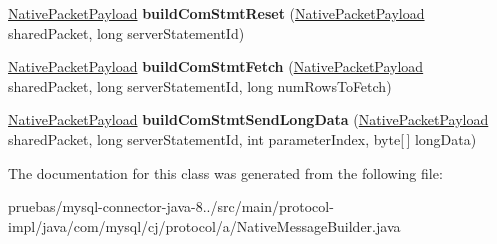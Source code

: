 \begin{DoxyCompactItemize}
\item 
\mbox{\label{classcom_1_1mysql_1_1cj_1_1protocol_1_1a_1_1_native_message_builder_a4acc76dd73bf697fc9757adf5e379682}} 
\mbox{\hyperlink{classcom_1_1mysql_1_1cj_1_1protocol_1_1a_1_1_native_packet_payload}{Native\+Packet\+Payload}} {\bfseries build\+Com\+Stmt\+Reset} (\mbox{\hyperlink{classcom_1_1mysql_1_1cj_1_1protocol_1_1a_1_1_native_packet_payload}{Native\+Packet\+Payload}} shared\+Packet, long server\+Statement\+Id)
\item 
\mbox{\label{classcom_1_1mysql_1_1cj_1_1protocol_1_1a_1_1_native_message_builder_a90d0a8827a6f07a6c70ffc5e3606b017}} 
\mbox{\hyperlink{classcom_1_1mysql_1_1cj_1_1protocol_1_1a_1_1_native_packet_payload}{Native\+Packet\+Payload}} {\bfseries build\+Com\+Stmt\+Fetch} (\mbox{\hyperlink{classcom_1_1mysql_1_1cj_1_1protocol_1_1a_1_1_native_packet_payload}{Native\+Packet\+Payload}} shared\+Packet, long server\+Statement\+Id, long num\+Rows\+To\+Fetch)
\item 
\mbox{\label{classcom_1_1mysql_1_1cj_1_1protocol_1_1a_1_1_native_message_builder_a1b4d0f770f5d97e69682bdcaa9e1bd6e}} 
\mbox{\hyperlink{classcom_1_1mysql_1_1cj_1_1protocol_1_1a_1_1_native_packet_payload}{Native\+Packet\+Payload}} {\bfseries build\+Com\+Stmt\+Send\+Long\+Data} (\mbox{\hyperlink{classcom_1_1mysql_1_1cj_1_1protocol_1_1a_1_1_native_packet_payload}{Native\+Packet\+Payload}} shared\+Packet, long server\+Statement\+Id, int parameter\+Index, byte\mbox{[}$\,$\mbox{]} long\+Data)
\end{DoxyCompactItemize}


The documentation for this class was generated from the following file\+:\begin{DoxyCompactItemize}
\item 
pruebas/mysql-\/connector-\/java-\/8../src/main/protocol-\/impl/java/com/mysql/cj/protocol/a/Native\+Message\+Builder.\+java\end{DoxyCompactItemize}

